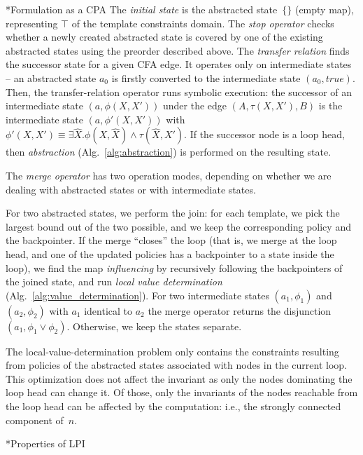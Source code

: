\documentclass{llncs}
\makeatletter
\newcommand{\tuple}[1]{\ensuremath{\left( #1 \right) }}
\newcommand{\cfa}{\textsc{CFA}\xspace}
\renewcommand{\paragraph}{\@startsection{paragraph}{4}{\z@}{0.8ex \@plus 0ex \@minus 1ex}{-1em}{\normalfont\normalsize\bfseries}}
\makeatother
\begin{document}
\paragraph*{Formulation as a CPA}
The \emph{initial state} is the abstracted state~$\{\}$ (empty map),
representing $\top$ of the template constraints domain.
The \emph{stop operator} checks whether a newly created abstracted state
is covered by one of the existing abstracted states using the preorder described above.
The \emph{transfer relation} finds the successor state for a given \cfa edge.
It operates only on intermediate states -- an abstracted
state $a_0$ is firstly converted to the intermediate state $\tuple{a_0, \mathit{true}}$.
Then, the transfer-relation operator runs symbolic execution:
the successor of an intermediate state $\tuple{a, \phi(X, X')}$ under the edge
$\tuple{A, \tau(X, X'), B}$
is the intermediate state $\tuple{a, \phi'(X, X')}$ with $\phi'(X, X') \equiv \exists
\hat{X} . \phi(X, \hat{X}) \land \tau(\hat{X}, X')$.
If the successor node is a loop head, then \emph{abstraction}
(Alg.~\ref{alg:abstraction}) is performed on the resulting state.

The \emph{merge operator} has two operation
modes, depending on whether we are dealing with abstracted states or with
intermediate states.

For two abstracted states, we perform the join: for each template,
we pick the largest bound out of the two possible,
and we keep the corresponding policy and the backpointer.
If the merge ``closes'' the loop (that is, we merge at the loop head, and one of
the updated policies has a backpointer to a state inside the loop), we find the
map \emph{influencing} by recursively following the backpointers of the joined
state, and run \emph{local value determination}
(Alg.~\ref{alg:value_determination}).
For two intermediate states $\tuple{a_1, \phi_1}$ and $\tuple{a_2, \phi_2}$
with $a_1$ identical to $a_2$
the merge operator returns the disjunction $\tuple{a_1, \phi_1 \lor \phi_2}$.
Otherwise, we keep the states separate.

The local-value-determination problem only contains the constraints resulting
from policies of the abstracted states associated with nodes in the current loop.
This optimization does not affect the invariant as only the nodes
dominating the loop head can change it.
Of those, only the invariants of the nodes reachable from the
loop head can be affected by the computation:
i.e., the strongly connected component of~$n$.

\paragraph*{Properties of LPI}~
\end{document}
